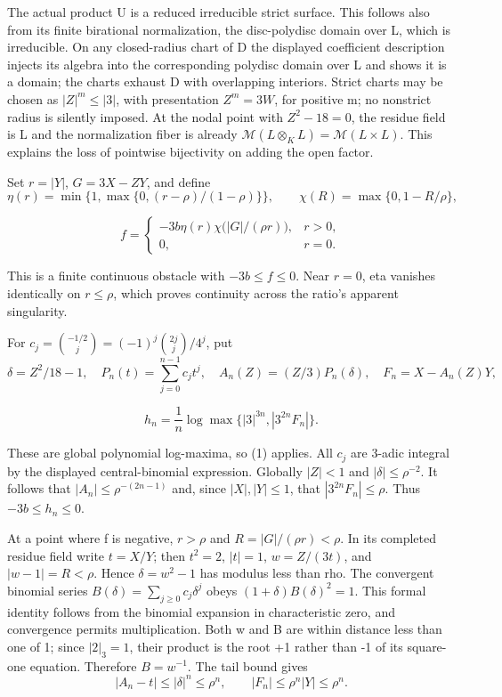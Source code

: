 \documentclass[11pt,a4paper]{article}
\begin{document}
The actual product U is a reduced irreducible strict surface. This follows also from its finite birational normalization, the disc-polydisc domain over L, which is irreducible. On any closed-radius chart of D the displayed coefficient description injects its algebra into the corresponding polydisc domain over L and shows it is a domain; the charts exhaust D with overlapping interiors. Strict charts may be chosen as \(|Z|^m\leq|3|\), with presentation \(Z^m=3W\), for positive m; no nonstrict radius is silently imposed. At the nodal point with \(Z^2-18=0\), the residue field is L and the normalization fiber is already \(\mathcal M(L\otimes_K L)=\mathcal M(L\times L)\). This explains the loss of pointwise bijectivity on adding the open factor.

Set \(r=|Y|\), \(G=3X-ZY\), and define
\[
\eta(r)=\min\{1,\max\{0,(r-\rho)/(1-\rho)\}\},\qquad
\chi(R)=\max\{0,1-R/\rho\},
\]

\[
f=\begin{cases}-3b\eta(r)\chi\bigl(|G|/(\rho r)\bigr),&r>0,\\0,&r=0.\end{cases}
\tag{17}
\]

This is a finite continuous obstacle with \(-3b\leq f\leq0\). Near \(r=0\), eta vanishes identically on \(r\leq\rho\), which proves continuity across the ratio's apparent singularity.

For \(c_j=\binom{-1/2}{j}=(-1)^j\binom{2j}{j}/4^j\), put
\[
\delta=Z^2/18-1,\quad P_n(t)=\sum_{j=0}^{n-1}c_jt^j,\quad
A_n(Z)=(Z/3)P_n(\delta),\quad F_n=X-A_n(Z)Y,
\]

\[
h_n=\frac1n\log\max\{|3|^{3n},|3^{2n}F_n|\}.
\tag{18}
\]

These are global polynomial log-maxima, so (1) applies. All \(c_j\) are 3-adic integral by the displayed central-binomial expression. Globally \(|Z|<1\) and \(|\delta|\leq\rho^{-2}\). It follows that \(|A_n|\leq\rho^{-(2n-1)}\) and, since \(|X|,|Y|\leq1\), that \(|3^{2n}F_n|\leq\rho\). Thus \(-3b\leq h_n\leq0\).

At a point where f is negative, \(r>\rho\) and \(R=|G|/(\rho r)<\rho\). In its completed residue field write \(t=X/Y\); then \(t^2=2\), \(|t|=1\), \(w=Z/(3t)\), and \(|w-1|=R<\rho\). Hence \(\delta=w^2-1\) has modulus less than rho. The convergent binomial series \(B(\delta)=\sum_{j\geq0}c_j\delta^j\) obeys \((1+\delta)B(\delta)^2=1\). This formal identity follows from the binomial expansion in characteristic zero, and convergence permits multiplication. Both w and B are within distance less than one of 1; since \(|2|_3=1\), their product is the root +1 rather than -1 of its square-one equation. Therefore \(B=w^{-1}\). The tail bound gives
\[
|A_n-t|\leq|\delta|^n\leq\rho^n,\qquad
|F_n|\leq\rho^n|Y|\leq\rho^n.
\]
\end{document}

